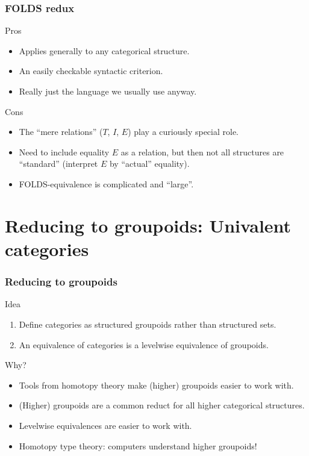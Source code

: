 \documentclass{beamer}
\begin{document}
\begin{frame}
  \frametitle{FOLDS redux}
  \begin{block}{Pros}
    \begin{itemize}
    \item Applies generally to any categorical structure.
    \item An easily checkable syntactic criterion.
    \item Really just the language we usually use anyway.
    \end{itemize}
  \end{block}
  \pause
  \begin{block}{Cons}
    \begin{itemize}
    \item The ``mere relations'' ($T$, $I$, $E$) play a curiously special role.
    \item Need to include equality $E$ as a relation, but then not all structures are ``standard'' (interpret $E$ by ``actual'' equality).
    \item FOLDS-equivalence is complicated and ``large''.
    \end{itemize}
  \end{block}
\end{frame}

\section{Reducing to groupoids: Univalent categories}
\label{sec:univalence}

\begin{frame}
  \frametitle{Reducing to groupoids}
  \begin{block}{Idea}
    \begin{enumerate}
    \item Define categories as \alert<1>{structured groupoids} rather than structured sets.
    \item An equivalence of categories is a levelwise equivalence of groupoids.
    \end{enumerate}
  \end{block}
  Why?
  \begin{itemize}
  \item Tools from homotopy theory make (higher) groupoids easier to work with.
  \item (Higher) groupoids are a common reduct for all higher categorical structures.
  \item Levelwise equivalences are easier to work with.
  \item Homotopy type theory: computers understand higher groupoids!
  \end{itemize}
\end{frame}
\end{document}
